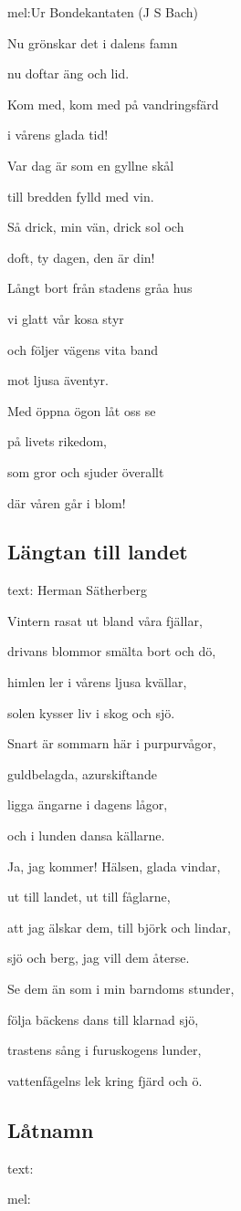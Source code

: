 mel:Ur Bondekantaten (J S Bach)\bigskip

Nu grönskar det i dalens famn

nu doftar äng och lid.

Kom med, kom med på vandringsfärd

i vårens glada tid!

Var dag är som en gyllne skål

till bredden fylld med vin.

Så drick, min vän, drick sol och

doft, ty dagen, den är din!

Långt bort från stadens gråa hus

vi glatt vår kosa styr

och följer vägens vita band

mot ljusa äventyr.

Med öppna ögon låt oss se

på livets rikedom,

som gror och sjuder överallt

där våren går i blom! 

\subsection{\textbf{Längtan till landet}}

text: Herman Sätherberg\bigskip


Vintern rasat ut bland våra fjällar,

drivans blommor smälta bort och dö,

himlen ler i vårens ljusa kvällar,

solen kysser liv i skog och sjö.\bigskip


Snart är sommarn här i purpurvågor,

guldbelagda, azurskiftande

ligga ängarne i dagens lågor,

och i lunden dansa källarne.\bigskip


Ja, jag kommer! Hälsen, glada vindar,

ut till landet, ut till fåglarne,

att jag älskar dem, till björk och lindar,

sjö och berg, jag vill dem återse. \bigskip


Se dem än som i min barndoms stunder,

följa bäckens dans till klarnad sjö,

trastens sång i furuskogens lunder,

vattenfågelns lek kring fjärd och ö. \bigskip

\subsection{\textbf{Låtnamn}}

text:

mel:\bigskip




\newpage
